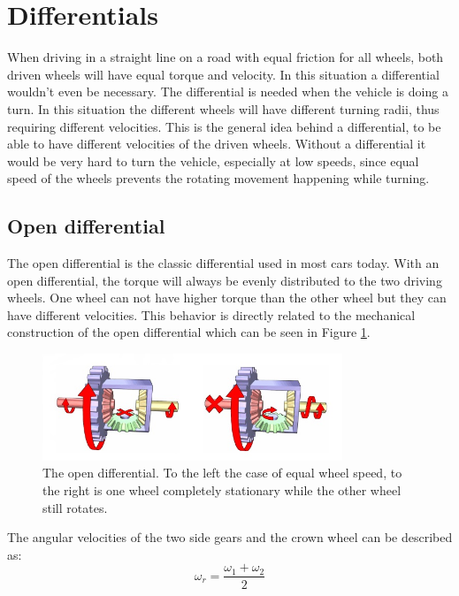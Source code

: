 \section{Differentials}

When driving in a straight line on a road with equal friction for all wheels, both driven wheels will have equal torque and velocity. In this situation a differential wouldn't even be necessary. The differential is needed when the vehicle is doing a turn. In this situation the different wheels will have different turning radii, thus requiring different velocities. This is the general idea behind a differential, to be able to have different velocities of the driven wheels. Without a differential it would be very hard to turn the vehicle, especially at low speeds, since equal speed of the wheels prevents the rotating movement happening while turning.

\subsection{Open differential}
The open differential is the classic differential used in most cars today. With an open differential, the torque will always be evenly distributed to the two driving wheels. One wheel can not have higher torque than the other wheel but they can have different velocities. This behavior is directly related to the mechanical construction of the open differential which can be seen in Figure \ref{wikidiff}. 
\begin{figure}[h]
	\centering
	\includegraphics[width=0.8\textwidth]{Pictures/opendiff}
	\caption{The open differential. To the left the case of equal wheel speed, to the right is one wheel completely stationary while the other wheel still rotates. \cite{wikidiff}}
	\label{wikidiff}
\end{figure}
The angular velocities of the two side gears and the crown wheel can be described as:
\begin{equation}
\omega_{r} = \frac{\omega_{1} + \omega_{2}}{2}
\label{eq:diff}
\end{equation}


